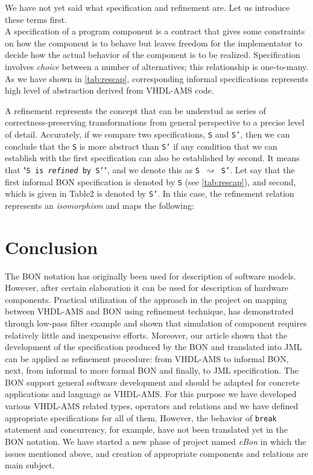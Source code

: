\documentclass{article}
\begin{document}

We have not yet said what specification and refinement are.
Let us introduce these terms first.\\ 
A specification of a program component is a contract that gives some constraints 
on how the component is to behave but leaves freedom for the implementator to 
decide how the actual behavior of the component is to be realized.
Specification involves \emph{choice} between a number of alternatives; this 
 relationship is one-to-many. As we have shown in \autoref{tab:rescap}, corresponding 
informal specifications represents high level of abstraction derived from VHDL-AMS code.

A refinement represents the concept that can be understud as series of 
correctness-preserving transformations from general perspective to 
a precise level of detail. Accurately, if we compare two specifications,
\texttt{S} and \texttt{S'}, then we can conclude that the \texttt{S} 
is more abstract than \texttt{S'} if any condition that we can establish 
with the first specification can also be established by second. 
It means that "\texttt{S is \emph{refined} by S'}", 
and we denote this  as \texttt{S $\rightsquigarrow$ S'}.
Let say that the first informal BON specification is denoted by 
\texttt{S} (see \autoref{tab:rescap}), and second, which is given in Table2  is denoted by \texttt{S'}.
In this case, the refinement relation represents an \emph{isomorphism} 
and maps the following:
\section{Conclusion}
\label{sec:conclusion}
The BON notation has originally been used for description of 
software models. However, after certain elaboration it can be used 
for description of hardware components. Practical utilization of the approach
in the project on mapping between VHDL-AMS and BON using refinement technique,
has demonstrated through low-pass filter example and shown that simulation
of component requires relatively little and inexpensive  efforts. Moreover, our article shown
that the development of the specification produced by the BON and translated 
into JML can be applied as refinement procedure: from VHDL-AMS to informal BON, 
next, from informal to more formal BON and finally, to JML specification. 
The BON support general software development and should be adapted for concrete
applications and language as VHDL-AMS. For this purpose we have developed various 
VHDL-AMS related types, operators and relations and we have defined appropriate 
specifications for all of them. However, the behavior of
\texttt{break} statement and  concurrency, for example, have not been translated 
yet in the BON notation. We have started a new phase of project named \emph{eBon} in which
the issues mentioned above, and creation of appropriate components and relations 
are main subject.       
\end{document}
